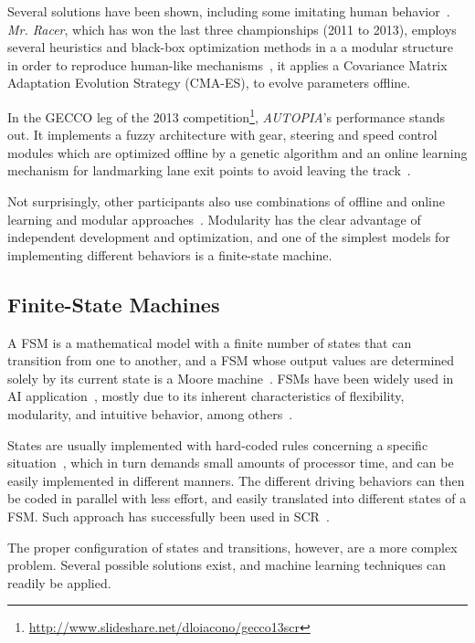 Several solutions have been shown, including some imitating human behavior~\cite{Exp,5593318}. \emph{Mr. Racer}, which has won the last three championships (2011 to 2013), employs several heuristics and black-box optimization methods in a a modular structure in order to reproduce human-like mechanisms~\cite{MrRacer}, it applies a Covariance Matrix Adaptation Evolution Strategy (CMA-ES), to evolve parameters offline.

In the GECCO leg of the 2013 competition\footnote{\url{http://www.slideshare.net/dloiacono/gecco13scr}}, \emph{AUTOPIA}'s performance stands out. It implements a fuzzy architecture with gear, steering and speed control modules which are optimized offline by a genetic algorithm and an online learning mechanism for landmarking lane exit points to avoid leaving the track~\cite{AUTOPIA}.

Not surprisingly, other participants also use combinations of offline and online learning and modular approaches~\cite{2009,DIEGO,Exp}. Modularity has the clear advantage of independent development and optimization\cite{MrRacer,AUTOPIA2009}, and one of the simplest models for implementing different behaviors is a finite-state machine.

\subsection{Finite-State Machines}%
A FSM is a mathematical model with a finite number of states that can transition from one to another, and a FSM whose output values are determined solely by its current state is a Moore machine~\cite{Ajzerman}. FSMs have been widely used in AI application~\cite{Millington:2006:FSM}, mostly due to its inherent characteristics of flexibility, modularity, and intuitive behavior, among others~\cite{Buckland:2005:AI}.

States are usually implemented with hard-coded rules concerning a specific situation~\cite{Buckland:2005:AI}, which in turn demands small amounts of processor time, and can be easily implemented in different manners. The different driving behaviors can then be coded in parallel with less effort, and easily translated into different states of a FSM. Such approach has successfully been used in SCR~\cite{2009,DIEGO}.

The proper configuration of states and transitions, however, are a more complex problem. Several possible solutions exist, and machine learning techniques can readily be applied.

